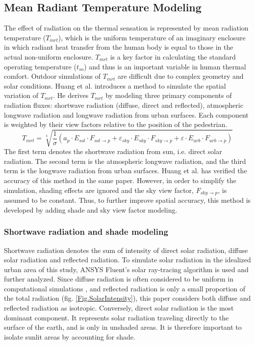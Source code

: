 \documentclass[preprint,3p,12pt,english]{elsarticle}
\begin{document}
\subsection{Mean Radiant Temperature Modeling}
The effect of radiation on the thermal sensation is represented by mean radiation temperature ($T_{mrt}$), which is the uniform temperature of an imaginary enclosure in which radiant heat transfer from the human body is equal to those in the actual non-uniform enclosure. $T_{mrt}$ is a key factor in calculating the standard operating temperature ($t_{so}$) and thus is an important variable in human thermal comfort. Outdoor simulations of $T_{mrt}$ are difficult due to complex geometry and solar conditions. Huang et al. \cite{huang2014citycomfort+} introduces a method to simulate the spatial variation of $T_{mrt}$. He derives $T_{mrt}$ by modeling three primary components of radiation fluxes: shortwave radiation (diffuse, direct and reflected), atmospheric longwave radiation and longwave radiation from urban surfaces. Each component is weighted by their view factors relative to the position of the pedestrian.
\begin{equation}
T_{mrt}=\sqrt[4]{\frac{1}{\sigma}(a_{p}{\cdot}E_{sol}{\cdot}F_{sol\rightarrow{p}}+\varepsilon_{sky}{\cdot}E_{sky}{\cdot}F_{sky\rightarrow{p}}+\varepsilon{\cdot}E_{urb}{\cdot}F_{urb\rightarrow{p}})}
\label{Equ.MRT}
\end{equation}
The first term denotes the shortwave radiation from sun, i.e. direct solar radiation. The second term is the atmospheric longwave radiation, and the third term is the longwave radiation from urban surfaces. Huang et al. has verified the accuracy of this method in the same paper\cite{huang2014citycomfort+}. However, in order to simplify the simulation, shading effects are ignored and the sky view factor, $F_{sky\rightarrow{p}}$, is assumed to be constant. Thus, to further improve spatial accuracy, this method is developed by adding shade and sky view factor modeling.

\subsubsection{Shortwave radiation and shade modeling}
Shortwave radiation denotes the sum of intensity of direct solar radiation, diffuse solar radiation and reflected radiation. To simulate solar radiation in the idealized urban area of this study, ANSYS Fluent's solar ray-tracing algorithm is used and further analyzed. Since diffuse radiation is often considered to be uniform in computational simulations \cite{flint1998solar, sreekumar1998egret, madronich1999role}, and reflected radiation is only a small proportion of the total radiation (fig. \ref{Fig.SolarIntensity}), this paper considers both diffuse and reflected radiation as isotropic. Conversely, direct solar radiation is the most dominant component. It represents solar radiation traveling directly to the surface of the earth, and is only in unshaded areas. It is therefore important to isolate sunlit areas by accounting for shade.
\end{document}
